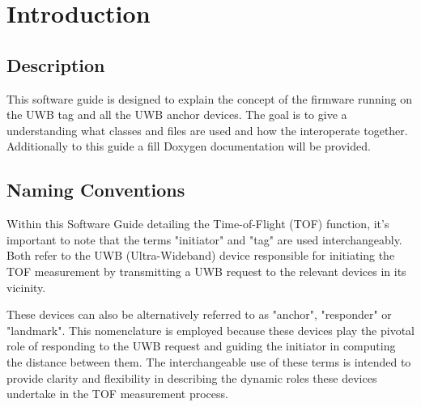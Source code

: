 \chapter{Introduction}

\section{Description}

This software guide is designed to explain the concept of the firmware running on the UWB tag and all the UWB anchor devices. 
The goal is to give a understanding what classes and files are used and how the interoperate together. 
Additionally to this guide a fill Doxygen documentation will be provided. 

\section{Naming Conventions}
Within this Software Guide detailing the Time-of-Flight (TOF) function, it's important to note that the terms "initiator" and "tag" are used interchangeably. 
Both refer to the UWB (Ultra-Wideband) device responsible for initiating the TOF measurement by transmitting a UWB request to the relevant devices in its vicinity.

These devices can also be alternatively referred to as "anchor", "responder" or "landmark". This nomenclature is employed because these devices play the pivotal role of responding to the UWB request and guiding the initiator in computing the distance between them. The interchangeable use of these terms is intended to provide clarity and flexibility in describing the dynamic roles these devices undertake in the TOF measurement process.

